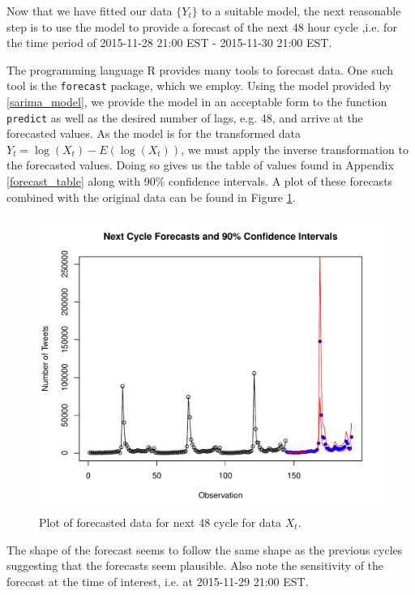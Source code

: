 Now that we have fitted our data $\{Y_t\}$ to a suitable model, the next
reasonable step is to use the model to provide a forecast of the next 48 hour cycle
,i.e. for the time period of 2015-11-28 21:00 EST - 2015-11-30 21:00 EST.

The programming language R provides many tools to forecast data. One such tool
is the \texttt{forecast} package, which we employ. Using the model provided by
\eqref{sarima_model}, we provide the model in an acceptable form to the
function \texttt{predict} as well as the desired number of lags, e.g. 48,
and arrive at the forecasted values. As the model is for the transformed data
$Y_t = \log(X_t) - E(\log(X_t))$, we must apply the inverse transformation to the
forecasted values. Doing so gives us the table of values found in Appendix
\ref{forecast_table} along with 90\% confidence intervals. A plot of these
forecasts combined with the original data can be found in Figure \ref{forecast_plot}.

\begin{figure}[!h]
  \centerline{\includegraphics[scale=0.75]{../analysis/plots/forecast}}
  \caption{Plot of forecasted data for next 48 cycle for data $X_t$.}\label{forecast_plot}
\end{figure}

The shape of the forecast seems to follow the same shape as the previous cycles
suggesting that the forecasts seem plausible. Also note the sensitivity of
the forecast at the time of interest, i.e. at 2015-11-29 21:00 EST.